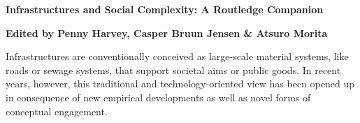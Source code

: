 \documentclass[a4,portrait,11pt]{article}
\begin{document}
\setlength{\oddsidemargin}{0.7875in-1in}
\setlength{\textwidth}{\paperwidth - 0.7875in-0.7875in}

\begin{flushleft}
\textbf{Infrastructures and Social Complexity: A Routledge Companion }
\end{flushleft}


\begin{flushleft}
\textbf{Edited by Penny Harvey, Casper Bruun Jensen \& Atsuro Morita}
\end{flushleft}


\begin{flushleft}

\end{flushleft}


\begin{flushleft}
Infrastructures are conventionally conceived as large-scale material systems, like roads or sewage systems, that support societal aims or public goods. In recent years, however, this traditional and technology-oriented view has been opened up in consequence of new empirical developments as well as novel forms of conceptual engagement. 
\end{flushleft}


\begin{flushleft}

\end{flushleft}
\end{document}
